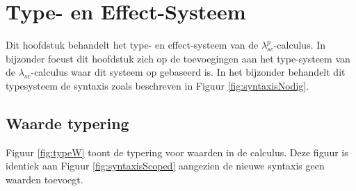 \chapter{Type- en Effect-Systeem}
\label{hoofdstuk:typesysteem}
Dit hoofdstuk behandelt het type- en effect-systeem van de $\lambda^{p}_{sc}$-calculus. In bijzonder focust dit hoofdstuk zich op de toevoegingen aan het type-systeem van de $\lambda_{sc}$-calculus waar dit systeem op gebaseerd is. In het bijzonder behandelt dit typesysteem de syntaxis zoals beschreven in Figuur \ref{fig:syntaxisNodig}.

\section{Waarde typering}
Figuur \ref{fig:typeW} toont de typering voor waarden in de calculus. Deze figuur is identiek aan Figuur \ref{fig:syntaxisScoped} aangezien de nieuwe syntaxis geen waarden toevoegt.


